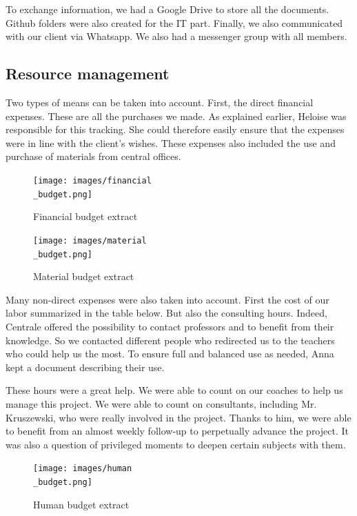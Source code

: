 \bigbreak

To exchange information, we had a Google Drive to store all the documents. Github folders were also created for the IT part. Finally, we also communicated with our client via Whatsapp. We also had a messenger group with all members. 

\subsection{Resource management}

\hspace{\parindent} Two types of means can be taken into account. First, the direct financial expenses. These are all the purchases we made. As explained earlier, Heloise was responsible for this tracking. She could therefore easily ensure that the expenses were in line with the client's wishes. These expenses also included the use and purchase of materials from central offices. 

\begin{figure}[ht]
    \centering
    \texttt{[image: images/financial\\\_budget.png]}
    \caption{Financial budget extract}
    \label{fig:mesh7}
\end{figure}

\begin{figure}[ht]
    \centering
    \texttt{[image: images/material\\\_budget.png]}
    \caption{Material budget extract}
    \label{fig:mesh8}
\end{figure}

Many non-direct expenses were also taken into account. First the cost of our labor summarized in the table below. But also the consulting hours. Indeed, Centrale offered the possibility to contact professors and to benefit from their knowledge. So we contacted different people who redirected us to the teachers who could help us the most. To ensure full and balanced use as needed, Anna kept a document describing their use. 

\bigbreak

These hours were a great help. We were able to count on our coaches to help us manage this project. We were able to count on consultants, including Mr. Kruszewski, who were really involved in the project. Thanks to him, we were able to benefit from an almost weekly follow-up to perpetually advance the project. It was also a question of privileged moments to deepen certain subjects with them.

\begin{figure}[ht]
    \centering
    \texttt{[image: images/human\\\_budget.png]}
    \caption{Human budget extract}
    \label{fig:mesh9}
\end{figure}